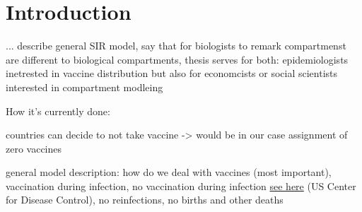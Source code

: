 \section{Introduction}
...
describe general SIR model, say that for biologists to remark compartmenst are different to biological compartments, thesis serves for both: epidemiologists inetrested in vaccine distribution but also for economcists or social scientists interested in compartment modleing 








How it's currently done:

countries can decide to not take vaccine -> would be in our case assignment of zero vaccines



general model description: how do we deal with vaccines (most important), vaccination during infection, no vaccination during infection \href{https://www.cdc.gov/vaccines/covid-19/info-by-product/clinical-considerations.html}{see here} (US Center for Disease Control), no reinfections, no births and other deaths